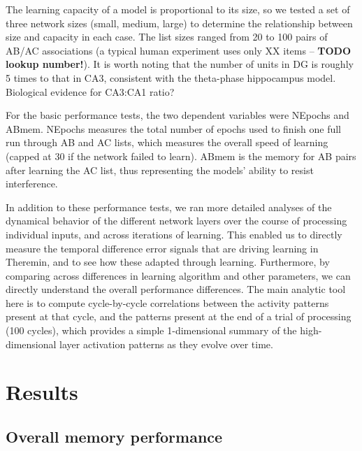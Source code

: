 \documentclass[11pt,twoside]{article}
\newif\myifpdf
\begin{document}
The learning capacity of a model is proportional to its size, so we tested a set of three network sizes (small, medium, large) to determine the relationship between size and capacity in each case.  The list sizes ranged from 20 to 100 pairs of AB/AC associations (a typical human experiment uses only XX items -- \textbf{TODO lookup number!}). It is worth noting that the number of units in DG is roughly 5 times to that in CA3, consistent with the theta-phase hippocampus model. Biological evidence for CA3:CA1 ratio?

For the basic performance tests, the two dependent variables were NEpochs and ABmem.  NEpochs measures the total number of epochs used to finish one full run through AB and AC lists, which measures the overall speed of learning (capped at 30 if the network failed to learn). ABmem is the memory for AB pairs after learning the AC list, thus representing the models' ability to resist interference.

In addition to these performance tests, we ran more detailed analyses of the dynamical behavior of the different network layers over the course of processing individual inputs, and across iterations of learning.  This enabled us to directly measure the temporal difference error signals that are driving learning in Theremin, and to see how these adapted through learning.  Furthermore, by comparing across differences in learning algorithm and other parameters, we can directly understand the overall performance differences.  The main analytic tool here is to compute cycle-by-cycle correlations between the activity patterns present at that cycle, and the patterns present at the end of a trial of processing (100 cycles), which provides a simple 1-dimensional summary of the high-dimensional layer activation patterns as they evolve over time.

\section{Results}

\subsection{Overall memory performance}
\end{document}
